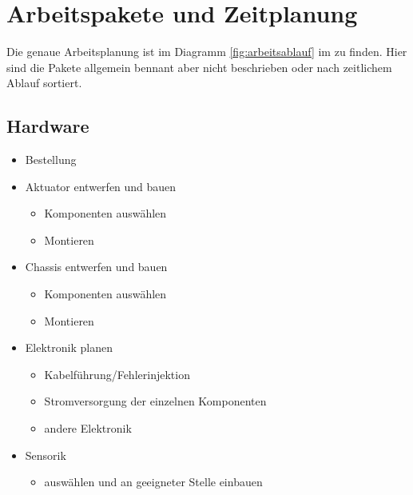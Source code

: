 \section{Arbeitspakete und Zeitplanung}
\label{ArbeitspaketeUndZeitplanung}
Die genaue Arbeitsplanung ist im Diagramm \ref{fig:arbeitsablauf} im  zu finden.
Hier sind die Pakete allgemein bennant aber nicht beschrieben oder nach zeitlichem Ablauf sortiert.\\
\subsection{Hardware}
\begin{itemize}
	\item Bestellung
	\item Aktuator entwerfen und bauen
	\begin{itemize}
		\item Komponenten auswählen
		 \item Montieren
	\end{itemize}
	\item Chassis entwerfen und bauen
	\begin{itemize}
		\item Komponenten auswählen
		\item Montieren
	\end{itemize}
	\item Elektronik planen
	\begin{itemize}
		\item Kabelführung/Fehlerinjektion
		\item Stromversorgung der einzelnen Komponenten
		\item andere Elektronik
	\end{itemize}
	\item Sensorik
	\begin{itemize}
		\item auswählen und an geeigneter Stelle einbauen
	\end{itemize}
\end{itemize} 


